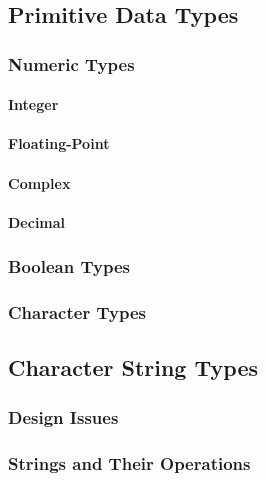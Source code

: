 \subsection{Primitive Data Types}\label{subsec:Primitive_Data_Types}
\subsubsection{Numeric Types}\label{subsubsec:Numeric_Primitive_Data_Types}
\paragraph{Integer}\label{par:Integer_Numeric_Primitive_Data_Type}
\paragraph{Floating-Point}\label{par:Floating_Point_Numeric_Primitive_Data_Type}
\paragraph{Complex}\label{par:Complex_Numeric_Primitive_Data_Type}
\paragraph{Decimal}\label{par:Decimal_Numeric_Primitive_Data_Type}

\subsubsection{Boolean Types}\label{subsubsec:Boolean_Primitive_Data_Types}
\subsubsection{Character Types}\label{subsubsec:Character_Primitive_Data_Types}

\subsection{Character String Types}\label{subsec:Character_String_Types}
\subsubsection{Design Issues}\label{subsubsec:Character_String_Types_Design_Issues}
\subsubsection{Strings and Their Operations}\label{subsubsec:String_Types_and_Ops}
